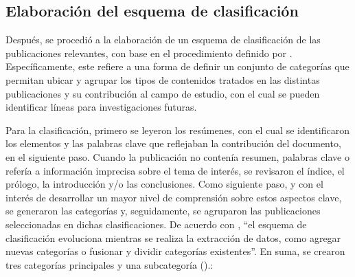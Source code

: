     
    \subsection{Elaboración del esquema de clasificación}\label{sub-sec-elaboracion-del-esquema-de-clasificacion}
    
    
    Después, se procedió a la elaboración de un esquema de clasificación de
    las publicaciones relevantes, con base en el procedimiento definido por
    \textcite{Petersen2008SystematicMapping}. Específicamente, este refiere a una forma
    de definir un conjunto de categorías que permitan ubicar y agrupar los
    tipos de contenidos tratados en las distintas publicaciones y su
    contribución al campo de estudio, con el cual se pueden identificar
    líneas para investigaciones futuras.
    
    Para la clasificación, primero se leyeron los resúmenes, con el cual se
    identificaron los elementos y las palabras clave que reflejaban la
    contribución del documento, en el siguiente paso. Cuando la publicación
    no contenía resumen, palabras clave o refería a información imprecisa
    sobre el tema de interés, se revisaron el índice, el prólogo, la
    introducción y/o las conclusiones. Como siguiente paso, y con el interés
    de desarrollar un mayor nivel de comprensión sobre estos aspectos clave,
    se generaron las categorías y, seguidamente, se agruparon las
    publicaciones seleccionadas en dichas clasificaciones. De acuerdo con
    \textcite[p.~5]{Petersen2008SystematicMapping}, ``el esquema de clasificación evoluciona
    mientras se realiza la extracción de datos, como agregar nuevas
    categorías o fusionar y dividir categorías existentes''. En suma,
    se crearon tres categorías principales y una subcategoría ().:
    
